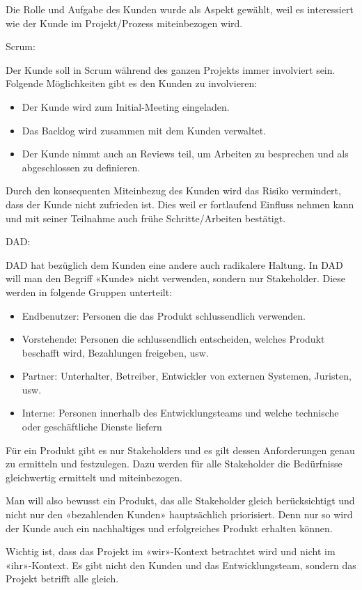 Die Rolle und Aufgabe des Kunden wurde als Aspekt gewählt, weil es interessiert wie der Kunde im Projekt/Prozess miteinbezogen wird. \medskip

{\Large Scrum:} \medskip

Der Kunde soll in Scrum während des ganzen Projekts immer involviert sein. Folgende Möglichkeiten gibt es den Kunden zu involvieren:
\begin{itemize}
	\item Der Kunde wird zum Initial-Meeting eingeladen.
	\item Das Backlog wird zusammen mit dem Kunden verwaltet.
	\item Der Kunde nimmt auch an Reviews teil, um Arbeiten zu besprechen und als abgeschlossen zu definieren.
\end{itemize}
Durch den konsequenten Miteinbezug des Kunden wird das Risiko vermindert, dass der Kunde nicht zufrieden ist. Dies weil er fortlaufend Einfluss nehmen kann und mit seiner Teilnahme auch frühe Schritte/Arbeiten bestätigt.
\bigskip 

\pagebreak
{\Large DAD:} \cite{collabCustomerRoleDad} \medskip

DAD hat bezüglich dem Kunden eine andere auch radikalere Haltung. In DAD will man den Begriff «Kunde» nicht verwenden, sondern nur Stakeholder. Diese werden in folgende Gruppen unterteilt:
\begin{itemize}
	\item Endbenutzer: Personen die das Produkt schlussendlich verwenden.
	\item Vorstehende: Personen die schlussendlich entscheiden, welches Produkt beschafft wird, Bezahlungen freigeben, usw.
	\item Partner: Unterhalter, Betreiber, Entwickler von externen Systemen, Juristen, usw.
	\item Interne: Personen innerhalb des Entwicklungsteams und welche technische oder geschäftliche Dienste liefern
\end{itemize}
Für ein Produkt gibt es nur Stakeholders und es gilt dessen Anforderungen genau zu ermitteln und festzulegen. Dazu werden für alle Stakeholder die Bedürfnisse gleichwertig ermittelt und miteinbezogen. \smallskip

Man will also bewusst ein Produkt, das alle Stakeholder gleich berücksichtigt und nicht nur den «bezahlenden Kunden» hauptsächlich priorisiert. Denn nur so wird der Kunde auch ein nachhaltiges und erfolgreiches Produkt erhalten können.

Wichtig ist, dass das Projekt im «wir»-Kontext betrachtet wird und nicht im «ihr»-Kontext. Es gibt nicht den Kunden und das Entwicklungsteam, sondern das Projekt betrifft alle gleich.

